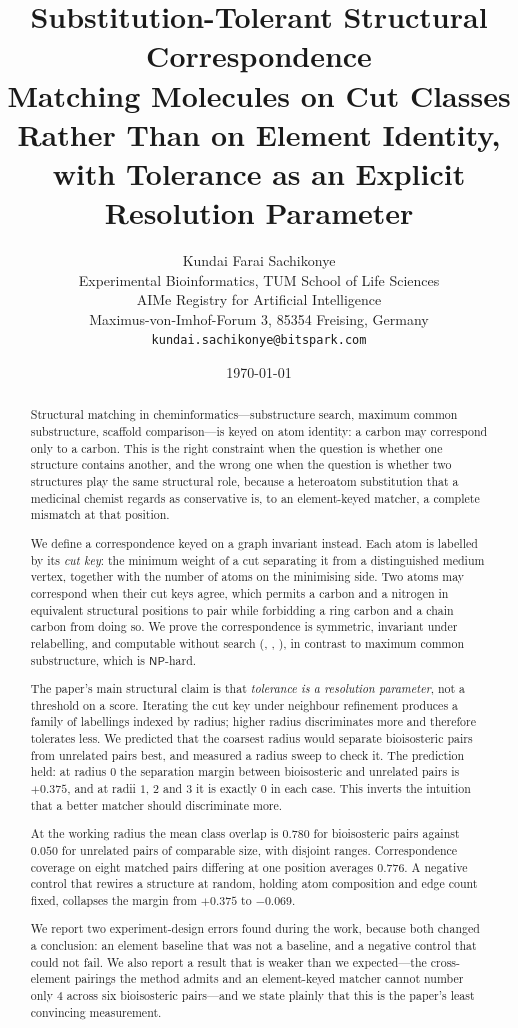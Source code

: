 \documentclass[11pt,twocolumn,a4paper]{article}
\title{\textbf{Substitution-Tolerant Structural Correspondence}\\[6pt]
\large Matching Molecules on Cut Classes Rather Than on Element
Identity,\\ with Tolerance as an Explicit Resolution Parameter}
\author{%
Kundai Farai Sachikonye\\[0.3em]
\normalsize Experimental Bioinformatics, TUM School of Life Sciences\\
\normalsize AIMe Registry for Artificial Intelligence \\
\normalsize Maximus-von-Imhof-Forum 3, 85354 Freising, Germany\\
\normalsize \texttt{kundai.sachikonye@bitspark.com}}
\date{\today}
\theoremstyle{scthm}
\theoremstyle{definition}
\theoremstyle{remark}
\begin{document}
\maketitle

\begin{abstract}
\noindent
Structural matching in cheminformatics---substructure search, maximum
common substructure, scaffold comparison---is keyed on atom identity: a
carbon may correspond only to a carbon. This is the right constraint when
the question is whether one structure contains another, and the wrong one
when the question is whether two structures play the same structural role,
because a heteroatom substitution that a medicinal chemist regards as
conservative is, to an element-keyed matcher, a complete mismatch at that
position.

We define a correspondence keyed on a graph invariant instead. Each atom
is labelled by its \emph{cut key}: the minimum weight of a cut separating
it from a distinguished medium vertex, together with the number of atoms
on the minimising side. Two atoms may correspond when their cut keys
agree, which permits a carbon and a nitrogen in equivalent structural
positions to pair while forbidding a ring carbon and a chain carbon from
doing so. We prove the correspondence is symmetric, invariant under
relabelling, and computable without search (,
, ), in contrast to maximum common
substructure, which is $\mathsf{NP}$-hard.

The paper's main structural claim is that \emph{tolerance is a resolution
parameter}, not a threshold on a score. Iterating the cut key under
neighbour refinement produces a family of labellings indexed by radius;
higher radius discriminates more and therefore tolerates less. We
predicted that the coarsest radius would separate bioisosteric pairs from
unrelated pairs best, and measured a radius sweep to check it. The
prediction held: at radius $0$ the separation margin between bioisosteric
and unrelated pairs is $+0.375$, and at radii $1$, $2$ and $3$ it is
exactly $0$ in each case. This inverts the intuition that a better
matcher should discriminate more.

At the working radius the mean class overlap is $0.780$ for bioisosteric
pairs against $0.050$ for unrelated pairs of comparable size, with
disjoint ranges. Correspondence coverage on eight matched pairs differing
at one position averages $0.776$. A negative control that rewires a
structure at random, holding atom composition and edge count fixed,
collapses the margin from $+0.375$ to $-0.069$.

We report two experiment-design errors found during the work, because both
changed a conclusion: an element baseline that was not a baseline, and a
negative control that could not fail. We also report a result that is
weaker than we expected---the cross-element pairings the method admits and
an element-keyed matcher cannot number only $4$ across six bioisosteric
pairs---and we state plainly that this is the paper's least convincing
measurement.
\end{abstract}
\end{document}
